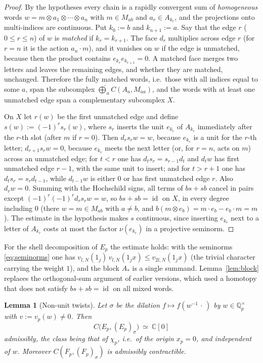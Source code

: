 \documentclass[11pt]{amsart}
\newtheorem{lemma}[theorem]{Lemma}
\theoremstyle{definition}
\theoremstyle{remark}
\newcommand{\C}{\mathbb C}
\newcommand{\Q}{\mathbb Q}
\newcommand{\id}{\operatorname{id}}
\begin{document}
\begin{proof}
By the hypotheses every chain is a rapidly convergent sum of
\emph{homogeneous} words $w=m\otimes a_1\otimes\cdots\otimes a_n$ with
$m\in M_{ab}$ and $a_r\in A_{k_r}$, and the projections onto multi-indices are
continuous.  Put $k_0:=b$ and $k_{n+1}:=a$.  Say that the edge $r$
($0\le r\le n$) of $w$ is \emph{matched} if $k_r=k_{r+1}$.  The face $d_r$
multiplies across edge $r$ (for $r=n$ it is the action $a_n\cdot m$), and it
vanishes on $w$ if the edge is unmatched, because then the product contains
$e_{k_r}e_{k_{r+1}}=0$.  A matched face merges two letters and leaves the
remaining edges, and whether they are matched, unchanged.  Therefore the
fully matched words, i.e.\ those with all indices equal to some $a$, span the
subcomplex $\widehat\bigoplus_aC(A_a,M_{aa})$, and the words with at least one
unmatched edge span a complementary subcomplex $X$.

On $X$ let $r(w)$ be the first unmatched edge and define
$s(w):=(-1)^{r}s_{r}(w)$, where $s_r$ inserts the unit $e_{k_r}$ of
$A_{k_r}$ immediately after the $r$-th slot (after $m$ if $r=0$).  Then
$d_rs_rw=w$, because $e_{k_r}$ is a unit for the $r$-th letter;
$d_{r+1}s_rw=0$, because $e_{k_r}$ meets the next letter (or, for $r=n$, acts
on $m$) across an unmatched edge; for $t<r$ one has $d_ts_r=s_{r-1}d_t$ and
$d_tw$ has first unmatched edge $r-1$, with the same unit to insert; and for
$t>r+1$ one has $d_ts_r=s_rd_{t-1}$, while $d_{t-1}w$ is either $0$ or has
first unmatched edge $r$.  Also $d_rw=0$.  Summing with the Hochschild signs,
all terms of $bs+sb$ cancel in pairs except $(-1)^{r}(-1)^{r}d_rs_rw=w$, so
$bs+sb=\id$ on $X$, in every degree including $0$ (there $w=m\in M_{ab}$ with
$a\ne b$, and $b(m\otimes e_b)=m\cdot e_b-e_b\cdot m=m$).  The estimate in the
hypothesis makes $s$ continuous, since inserting $e_{k_r}$ next to a letter of
$A_{k_r}$ costs at most the factor $\nu(e_{k_r})$ in a projective seminorm.
\end{proof}

For the shell decomposition of $E_p$ the estimate holds: with the seminorms
\eqref{eq:seminorms} one has $v_{l,N}(1_j)\,v_{l,N}(1_jx)\le
v_{2l,N}(1_jx)$ (the trivial character carrying the weight $1$), and the block
$A_*$ is a single summand.  Lemma~\ref{lem:block} replaces the orthogonal-sum
argument of earlier versions, which used a homotopy that does not satisfy
$bs+sb=\id$ on all mixed words.

\begin{lemma}[Non-unit twists]\label{lem:nonunit}
Let $\sigma$ be the dilation $f\mapsto f(w^{-1}\,\cdot\,)$ by
$w\in\Q_p^{\times}$ with $v:=v_p(w)\ne0$.  Then
\begin{equation}\label{eq:D1}
C\bigl(E_p,(E_p)_{\sigma}\bigr)\ \simeq\ \C[0]
\end{equation}
admissibly, the class being that of $\chi_p$, i.e.\ of the origin $x_p=0$, and
independent of $w$.  Moreover $C(F_p,(F_p)_{\sigma})$ is admissibly
contractible.
\end{lemma}
\end{document}
